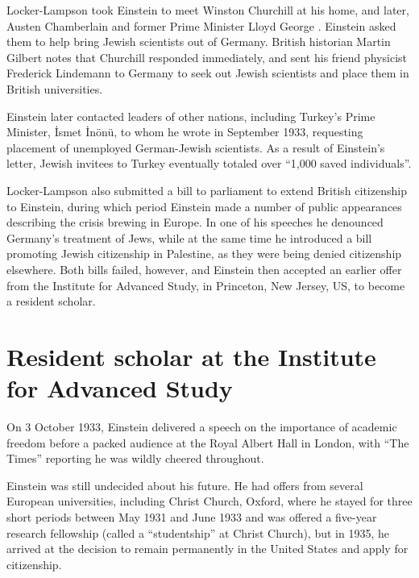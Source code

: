 \documentclass[twoside]{memoir}
\begin{document}
Locker-Lampson  took Einstein to meet Winston Churchill  at his home, and later, Austen Chamberlain  and former Prime Minister Lloyd George . Einstein asked them to help bring Jewish scientists out of Germany. British historian Martin Gilbert notes that Churchill responded immediately, and sent his friend physicist Frederick Lindemann to Germany to seek out Jewish scientists and place them in British universities.

Einstein later contacted leaders of other nations, including Turkey's Prime Minister, İsmet İnönü,  to whom he wrote in September 1933, requesting placement of unemployed German-Jewish scientists. As a result of Einstein's letter, Jewish invitees to Turkey eventually totaled over \enquote{1,000 saved individuals}.\cite{aDu8s}

Locker-Lampson also submitted a bill to parliament to extend British citizenship to Einstein, during which period Einstein made a number of public appearances describing the crisis brewing in Europe. In one of his speeches he denounced Germany's treatment of Jews, while at the same time he introduced a bill promoting Jewish citizenship in  Palestine, as they were being denied citizenship elsewhere. Both bills failed, however, and Einstein then accepted an earlier offer from the Institute for Advanced Study, in Princeton, New Jersey, US, to become a resident scholar.

\section{Resident scholar at the Institute for Advanced Study}\label{resident-scholar-at-the-institute-for-advanced-study}

On 3 October 1933,  Einstein delivered a speech on the importance of academic freedom before a packed audience at the Royal Albert Hall in London, with \enquote{The Times} reporting he was wildly cheered throughout.

Einstein was still undecided about his future. He had offers from several European universities, including Christ Church, Oxford, where he stayed for three short periods between May 1931 and June 1933 and was offered a five-year research fellowship (called a \enquote{studentship} at Christ Church),\cite{FFt5E}\cite{v8v06} but in 1935, he arrived at the decision to remain permanently in the United States and apply for citizenship.
\end{document}
